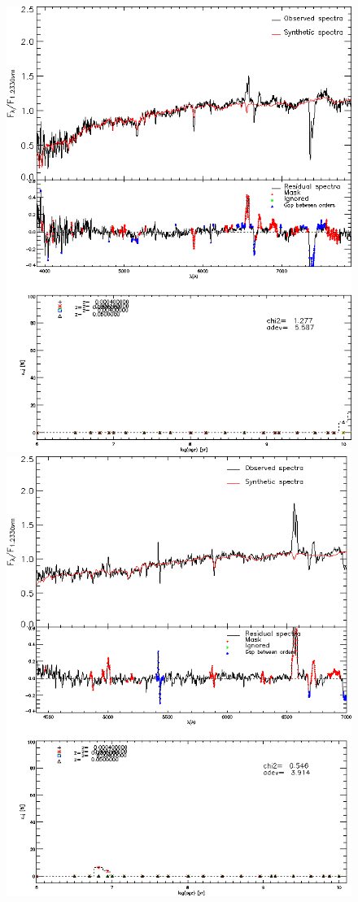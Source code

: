 \begin{figure}[ht!]
\begin{center}
        \includegraphics[scale = 0.35]{figuras/sp2.jpg}
        \includegraphics[scale = 0.35]{figuras/sp3.jpg}

\end{center}
\end{figure}
